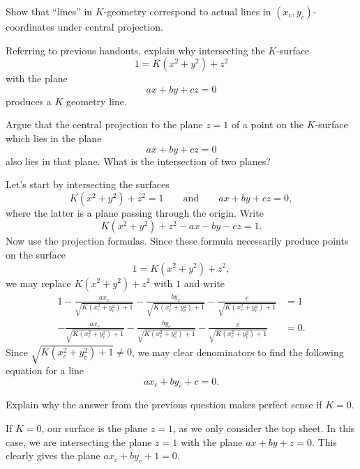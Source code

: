 \documentclass[newpage,hints,12pt,noauthor,handout,nooutcomes]{ximera}
\begin{document}
\begin{problem}
  Show that ``lines'' in $K$-geometry correspond to actual lines in
  $(x_{c},y_{c})$-coordinates under central projection.

\begin{hint}
  Referring to previous handouts, explain why intersecting the $K$-surface
  \[
  1 = K(x^2+y^2) + z^2 
  \]
  with the plane
  \[
  ax+by+cz = 0
  \]
  produces a $K$ geometry line.
\end{hint}

\begin{hint}
  Argue that the central projection to the plane $z=1$ of a point on the
  $K$-surface which lies in the plane
  $$ax+by+cz=0$$
  also lies in that plane.  What is the intersection of two planes?
\end{hint}

\begin{freeResponse}
  Let's start by intersecting the surfaces
  \[
  K(x^2+y^2)+z^2=1\qquad\text{and}\qquad ax+by+cz=0,
  \]
  where the latter is a plane passing through the origin. Write
  \[
  K(x^2+y^2)+z^2-ax-by-cz=1.
  \]
  Now use the projection formulas. Since these formula necessarily
  produce points on the surface
  \[
  1 = K\left(x^2+y^2\right) + z^2,
  \]
  we may replace $K\left(x^2+y^2\right) + z^2$ with $1$ and write
  \begin{align*}
    1-\frac{ax_c}{\sqrt{K\left(x_c^2 + y_c^2\right)+1}}- \frac{by_c}{\sqrt{K\left(x_c^2 + y_c^2\right)+1}}-\frac{c}{\sqrt{K\left(x_c^2 + y_c^2\right)+1}} &=1\\
    -\frac{ax_c}{\sqrt{K\left(x_c^2 + y_c^2\right)+1}}- \frac{by_c}{\sqrt{K\left(x_c^2 + y_c^2\right)+1}}-\frac{c}{\sqrt{K\left(x_c^2 + y_c^2\right)+1}} &=0.
  \end{align*}
  Since $\sqrt{K\left(x_c^2 + y_c^2\right)+1} \ne 0$, we may clear
  denominators to find the following equation for a line
  \[
  ax_c+by_c+c= 0.
  \]
\end{freeResponse}
\end{problem}

\begin{problem}
  Explain why the answer from the previous question makes perfect sense if $K=0$.
  \begin{freeResponse}
    If $K=0$, our surface is the plane $z=1$, as we only consider the
    top sheet. In this case, we are intersecting the plane $z=1$ with
    the plane $ax+by+z=0$. This clearly gives the plane $ax_c+ by_c +
    1 = 0.$
  \end{freeResponse}
\end{problem}
\end{document}
